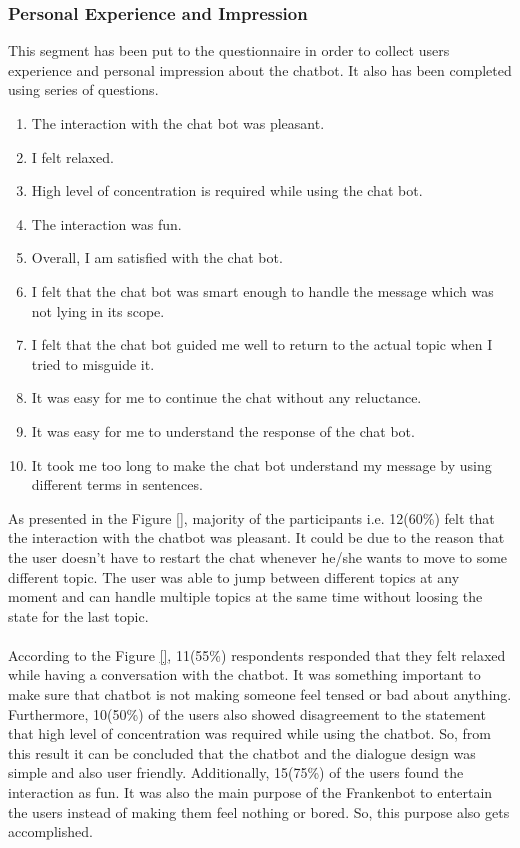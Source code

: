 \subsubsection*{Personal Experience and Impression}
This segment has been put to the questionnaire in order to collect users experience and personal impression about the chatbot. It also has been completed using series of questions. 
\begin{enumerate}
    \item The interaction with the chat bot was pleasant.
    \item I felt relaxed.
    \item High level of concentration is required while using the chat bot.
    \item The interaction was fun.
    \item Overall, I am satisfied with the chat bot.
    \item I felt that the chat bot was smart enough to handle the message which was not lying in its scope.
    \item I felt that the chat bot guided me well to return to the actual topic when I tried to misguide it.
    \item It was easy for me to continue the chat without any reluctance.
    \item It was easy for me to understand the response of the chat bot.
    \item It took me too long to make the chat bot understand my message by using different terms in sentences.
\end{enumerate}
As presented in the Figure \ref{}, majority of the participants i.e. 12(60\%) felt that the interaction with the chatbot was pleasant. It could be due to the reason that the user doesn't have to restart the chat whenever he/she wants to move to some different topic. The user was able to jump between different topics at any moment and can handle multiple topics at the same time without loosing the state for the last topic. 
\\~\\
According to the Figure \ref{}, 11(55\%) respondents responded that they felt relaxed while having a conversation with the chatbot. It was something important to make sure that chatbot is not making someone feel tensed or bad about anything. Furthermore, 10(50\%) of the users also showed disagreement to the statement that high level of concentration was required while using the chatbot. So, from this result it can be concluded that the chatbot and the dialogue design was simple and also user friendly. Additionally, 15(75\%) of the users found the interaction as fun. It was also the main purpose of the Frankenbot to entertain the users instead of making them feel nothing or bored. So, this purpose also gets accomplished. 
